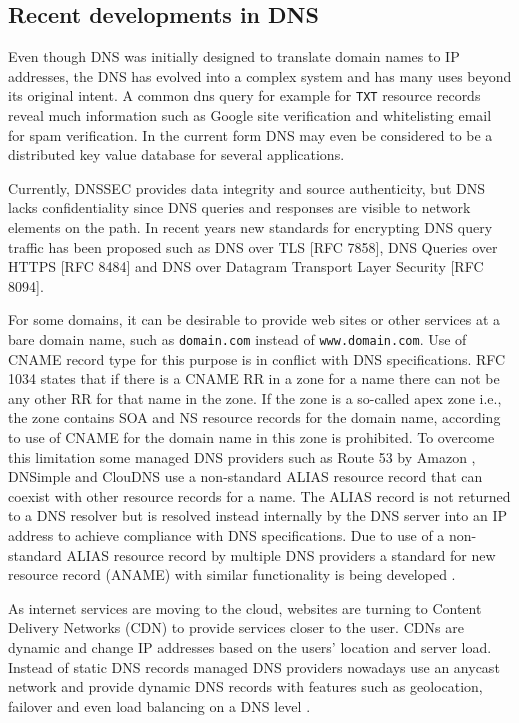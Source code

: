 \subsection{Recent developments in DNS}

Even though DNS was initially designed to translate domain names to IP addresses, the DNS has evolved into a complex system and has many uses beyond its original intent. A common dns query for example for \texttt{TXT} resource records reveal much information such as Google site verification and whitelisting email for spam verification. In the current form DNS may even be considered to be a distributed key value database for several applications.

Currently, DNSSEC provides data integrity and source authenticity, but DNS lacks confidentiality since DNS queries and responses are visible to network elements on the path. In recent years new standards for encrypting DNS query traffic has been proposed such as DNS over TLS [RFC 7858], DNS Queries over HTTPS [RFC 8484] and DNS over Datagram Transport Layer Security [RFC 8094]. 

For some domains, it can be desirable to provide web sites or other services at a bare domain name, such as \texttt{domain.com} instead of \texttt{www.domain.com}. Use of CNAME record type for this purpose is in conflict with DNS specifications. RFC 1034 \cite{RFC1034} states that if there is a CNAME RR in a zone for a name there can not be any other RR for that name in the zone. If the zone is a so-called apex zone i.e., the zone contains SOA and NS resource records for the domain name, according to \cite{RFC1034} use of CNAME for the domain name in this zone is prohibited. To overcome this limitation some managed DNS providers such as Route 53 by Amazon \cite{Route53}, DNSimple \cite{DNSimple} and ClouDNS \cite{ClouDNS} use a non-standard ALIAS resource record that can coexist with other resource records for a name. The ALIAS record is not returned to a DNS resolver but is resolved instead internally by the DNS server into an IP address to achieve compliance with DNS specifications. Due to use of a non-standard ALIAS resource record by multiple DNS providers a standard for new resource record (ANAME) with similar functionality is being developed \cite{ANAME}.

As internet services are moving to the cloud, websites are turning to Content Delivery Networks (CDN) to provide services closer to the user. CDNs are dynamic and change IP addresses based on the users' location and server load. Instead of static DNS records managed DNS providers nowadays use an anycast network and provide dynamic DNS records with features such as geolocation, failover and even load balancing on a DNS level \cite{ManagedDNS}.
